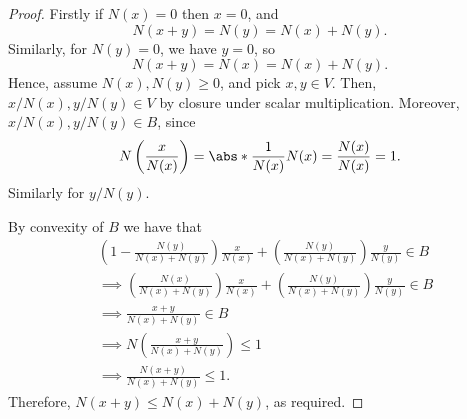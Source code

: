\documentclass[draft]{penrose}
\begin{document}
\begin{proof}
  Firstly if $N(x)=0$ then $x=0$, and
  \begin{equation*}
    N(x+y) = N(y) = N(x) + N(y).
  \end{equation*}
  Similarly, for $N(y)=0$, we have $y=0$, so
  \begin{equation*}
    N(x+y) = N(x) = N(x) + N(y).
  \end{equation*}
  Hence, assume $N(x), N(y) \geq 0$, and pick $x, y \in V$. Then, $x/N(x), y/N(y) \in V$ by closure under scalar multiplication. Moreover, $x/N(x), y/N(y) \in B$, since
  \begin{equation*}
    N\left(\frac{x}{N(x)}\right) = \abs*{\frac{1}{N(x)}}N(x) = \frac{N(x)}{N(x)} = 1.
  \end{equation*}
  Similarly for $y/N(y)$.

  By convexity of $B$ we have that
  \begin{align*}
  &\left(1 - \frac{N(y)}{N(x)+N(y)}\right)\frac{x}{N(x)} + \left(\frac{N(y)}{N(x)+N(y)}\right)\frac{y}{N(y)} \in B\\
  &\implies \left(\frac{N(x)}{N(x)+N(y)}\right)\frac{x}{N(x)} + \left(\frac{N(y)}{N(x)+N(y)}\right)\frac{y}{N(y)} \in B\\
  &\implies \frac{x+y}{N(x)+N(y)} \in B\\
  &\implies N\left(\frac{x+y}{N(x)+N(y)}\right) \leq 1\\
  &\implies \frac{N(x+y)}{N(x)+N(y)} \leq 1.
  \end{align*}
  Therefore, $N(x+y) \leq N(x) + N(y)$, as required.
\end{proof}
\end{document}
